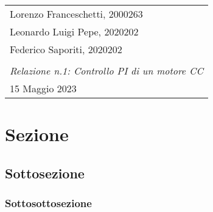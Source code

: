 \documentclass[a4paper,11pt, Arial]{article}
\newcommand{\class}{Laboratorio di Automatica}
\newcommand{\expT}{Controllo PI di un motore CC}
\newcommand{\repN}{1}
\newcommand{\stud}{Lorenzo Franceschetti, 2000263\\ Leonardo Luigi Pepe, 2020202\\ Federico Saporiti, 2020202\\}
\newcommand{\dateD}{15 Maggio 2023}
\begin{document}

\begin{center}
\begin{tabular}{| p{\textwidth} |}
    \hline
    \large
    \vspace{-2pt}
    \stud \hfill
    \Large
    \begin{center}
    {\color{BrickRed}
        \textsl{\class}\\
        \textsl{Relazione n.\repN: \expT}\\
        \large
        \dateD}
    \vspace{-4mm}
    \end{center}\\
    \hline
\end{tabular}
\end{center}

\section{Sezione}

\subsection{Sottosezione}

\subsubsection{Sottosottosezione}
\end{document}
